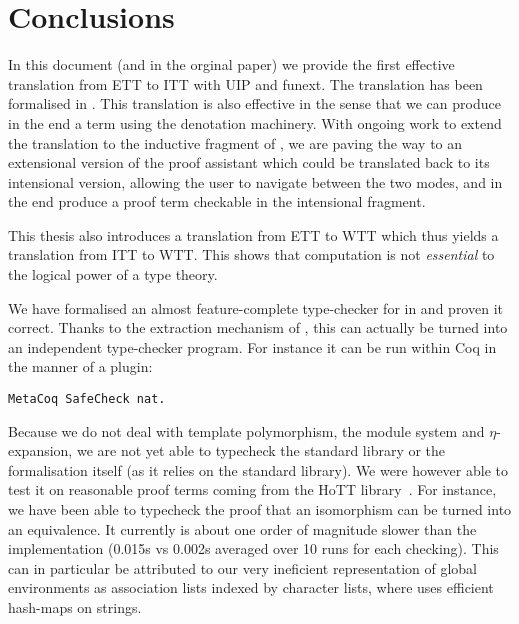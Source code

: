 \chapter{Conclusions}

In this document (and in the orginal paper) we provide the first effective
translation from \acrshort{ETT} to \acrshort{ITT} with \acrshort{UIP} and
\acrshort{funext}. The translation has been formalised in \Coq.
This translation is also effective in the sense that we can produce in the end a
\Coq term using the \MetaCoq denotation machinery.
%
With ongoing work to extend the translation to the inductive fragment
of \Coq, we are paving the way to an extensional version of the \Coq
proof assistant which could be translated back to its intensional
version, allowing the user to navigate between the two modes, and in
the end produce a proof term checkable in the intensional fragment.

This thesis also introduces a translation from \acrshort{ETT} to \acrshort{WTT}
which thus yields a translation from \acrshort{ITT} to \acrshort{WTT}. This
shows that computation is not \emph{essential} to the logical power of a type
theory.


We have formalised an almost feature-complete type-checker for \Coq in \Coq
and proven it correct. Thanks to the extraction mechanism of \Coq, this can
actually be turned into an independent type-checker program.
For instance it can be run within Coq in the manner of a plugin:
\begin{verbatim}
MetaCoq SafeCheck nat.
\end{verbatim}

Because we do not deal with template polymorphism, the module system and
\(\eta\)-expansion, we are not yet able to typecheck the standard library
or the formalisation itself (as it relies on the standard library).
We were however able to test it on reasonable proof terms coming from
the \acrshort{HoTT} library~.
%
For instance, we have been able to typecheck the proof that an isomorphism can
be turned into an equivalence.
It currently is about one order of magnitude slower than the \Coq
implementation (0.015s vs 0.002s averaged over 10 runs for each checking).
This can in particular be attributed to our very ineficient representation of
global environments as association lists indexed by character lists, where \Coq
uses efficient hash-maps on strings.

